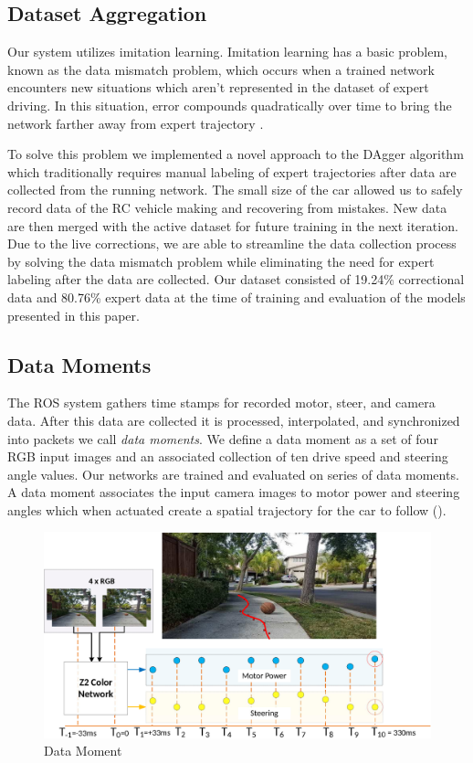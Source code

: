 \subsection{Dataset Aggregation}
Our system utilizes imitation learning. Imitation learning has a basic problem, known as the data mismatch problem, which occurs when a trained network encounters new situations which aren't represented in the dataset of expert driving. In this situation, error compounds quadratically over time to bring the network farther away from expert trajectory \cite{ross2010efficient}.

To solve this problem we implemented a novel approach to the DAgger algorithm \cite{ross2011reduction} which traditionally requires manual labeling of expert trajectories after data are collected from the running network. The small size of the car allowed us to safely record data of the RC vehicle making and recovering from mistakes. New data are then merged with the active dataset for future training in the next iteration. Due to the live corrections, we are able to streamline the data collection process by solving the data mismatch problem while eliminating the need for expert labeling after the data are collected. Our dataset consisted of 19.24\% correctional data and 80.76\% expert data at the time of training and evaluation of the models presented in this paper.

\subsection{Data Moments}

The ROS system gathers time stamps for recorded motor, steer, and camera data. After this data are collected it is processed, interpolated, and synchronized into packets we call \textit{data moments}. We define a data moment as a set of four RGB input images and an associated collection of ten drive speed and steering angle values. Our networks are trained and evaluated on   series of data moments. A data moment associates the input camera images to motor power and steering angles which when actuated create a spatial trajectory for the car to follow (). 

\begin{figure}
\centering
\includegraphics[width=\columnwidth]{paper/content/images/data_moment}
\caption{Data Moment}
\label{fig:moment}
\end{figure}

